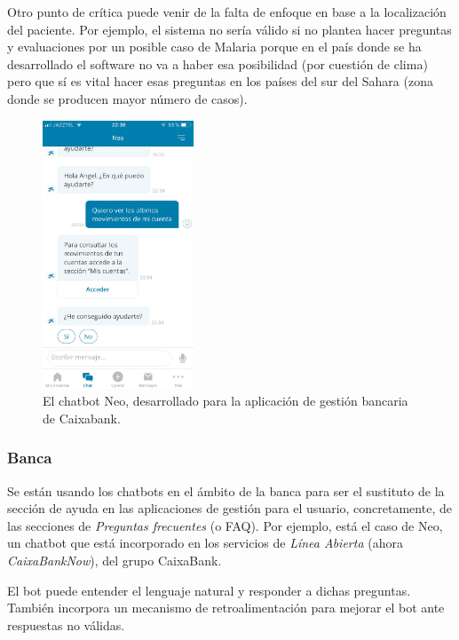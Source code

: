 \documentclass[spanish,12pt, a4paper, twoside]{paper}
\begin{document}
Otro punto de crítica puede venir de la falta de enfoque en base a la localización del paciente. Por ejemplo, el sistema no sería válido si no plantea hacer preguntas y evaluaciones por un posible caso de Malaria porque en el país donde se ha desarrollado el software no va a haber esa posibilidad (por cuestión de clima) pero que sí es vital hacer esas preguntas en los países del sur del Sahara (zona donde se producen mayor número de casos).
\newpage

\begin{figure}
\centering
	\includegraphics[width=0.4\textwidth]{recursos/neoCaixabank}
\caption{El chatbot Neo, desarrollado para la aplicación de gestión bancaria de Caixabank.}
\label{fig:Neo, bot de CaixaBank}
\end{figure}

\subsubsection{Banca}

Se están usando los chatbots en el ámbito de la banca para ser el sustituto de la sección de ayuda en las aplicaciones de gestión para el usuario, concretamente, de las secciones de \emph{Preguntas frecuentes} (o FAQ). Por ejemplo, está el caso de Neo, un chatbot que está incorporado en los servicios de \emph{Línea Abierta} (ahora \emph{CaixaBankNow}), del grupo CaixaBank.
\newline

El bot puede entender el lenguaje natural y responder a dichas preguntas. También incorpora un mecanismo de retroalimentación para mejorar el bot ante respuestas no válidas.
\end{document}
